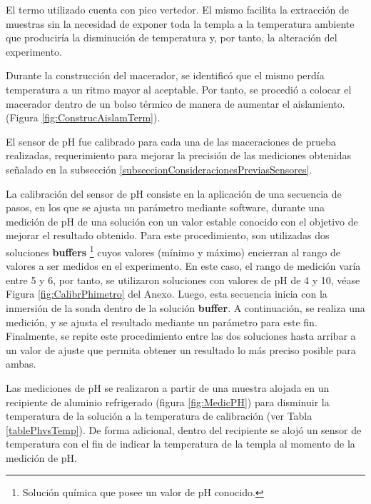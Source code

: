        \par El termo utilizado cuenta con pico vertedor. El mismo facilita la extracción de muestras sin la necesidad de exponer toda la templa a la temperatura ambiente que produciría la disminución de temperatura y, por tanto, la alteración del experimento.
        
        \par Durante la construcción del macerador, se identificó que el mismo perdía temperatura a un ritmo mayor al aceptable. Por tanto, se procedió a colocar el macerador dentro de un bolso térmico de manera de aumentar el aislamiento. (Figura \ref{fig:ConstrucAislamTerm}).
        
        \par El sensor de pH fue calibrado para cada una de las maceraciones de prueba realizadas, requerimiento para mejorar la precisión de las mediciones obtenidas señalado en la subsección \ref{subseccionConsideracionesPreviasSensores}.
        
        \par La calibración del sensor de pH consiste en la aplicación de una secuencia de pasos, en los que se ajusta un parámetro mediante software, durante una medición de pH de una solución con un valor estable conocido con el objetivo de mejorar el resultado obtenido. Para este procedimiento, son utilizadas dos soluciones \textbf{buffers} \footnote{Solución química que posee un valor de pH conocido.} cuyos valores (mínimo y máximo) encierran al rango de valores a ser medidos en el experimento. En este caso, el rango de medición varía entre 5 y 6, por tanto, se utilizaron soluciones con valores de pH de 4 y 10, véase Figura \ref{fig:CalibrPhimetro} del Anexo. Luego, esta secuencia inicia con la inmersión de la sonda dentro de la solución \textbf{buffer}. A continuación, se realiza una medición, y se ajusta el resultado mediante un parámetro para este fin. Finalmente, se repite este procedimiento entre las dos soluciones hasta arribar a un valor de ajuste que permita obtener un resultado lo más preciso posible para ambas.
        
        \par Las mediciones de pH se realizaron a partir de una muestra alojada en un recipiente de aluminio refrigerado (figura \ref{fig:MedicPH}) para disminuir la temperatura de la solución a la temperatura de calibración (ver Tabla \ref{tablePhvsTemp}). De forma adicional, dentro del recipiente se alojó un sensor de temperatura con el fin de indicar la temperatura de la templa al momento de la medición de pH.
        
